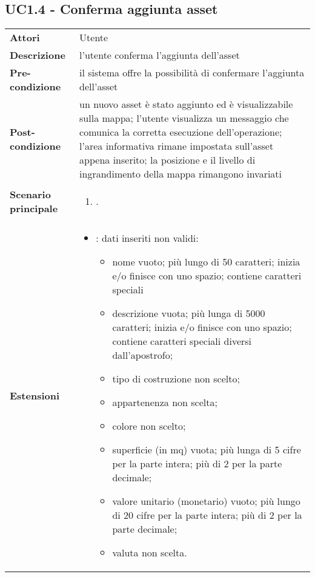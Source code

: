 \subsection{UC1.4 - Conferma aggiunta asset} 
\label{sssec:UC1.4} 
\def\arraystretch{1.5}
\begin{tabularx}{\textwidth}{l|p{}}
	\rowcolor{I} \multicolumn{2}{c}{\color{white}\textbf{UC1.4 - Conferma aggiunta asset}} \\
	\toprule
	\endhead
	\textbf{Attori} & Utente\\
	\textbf{Descrizione} & l'utente conferma l'aggiunta dell'asset\\
	\textbf{Pre-condizione} & il sistema offre la possibilità di confermare l'aggiunta dell'asset\\
	\textbf{Post-condizione} & un nuovo asset è stato aggiunto ed è visualizzabile sulla mappa; l'utente visualizza un messaggio che comunica la corretta esecuzione dell'operazione; l'area informativa rimane impostata sull'asset appena inserito; la posizione e il livello di ingrandimento della mappa rimangono invariati\\
	\textbf{Scenario principale} & \vspace{-1.2em}\begin{enumerate}[leftmargin=*,noitemsep,nosep]
		\item \nameref{sssec:UC1.4}.
	\end{enumerate}\\
	\textbf{Estensioni} & \vspace{-1.2em}\begin{itemize}[leftmargin=*,noitemsep,nosep]
		\item \nameref{sssec:UC1.5}: dati inseriti non validi:
		\begin{itemize}
			\item nome vuoto; più lungo di 50 caratteri;
			inizia e/o finisce con uno spazio; contiene caratteri speciali
			\item descrizione vuota; più lunga di 5000
			caratteri; inizia e/o finisce con uno spazio; contiene caratteri
			speciali diversi dall'apostrofo;
			\item tipo di costruzione non scelto;
			\item appartenenza non scelta;
			\item colore non scelto;
			\item superficie (in mq) vuota; più lunga di
			5 cifre per la parte intera; più di 2 per la parte decimale;
			\item valore unitario (monetario) vuoto; più
			lungo di 20 cifre per la parte intera; più di 2 per la parte
			decimale;
			\item valuta non scelta.
		\end{itemize}
	\end{itemize}\\
	\bottomrule
\end{tabularx}
